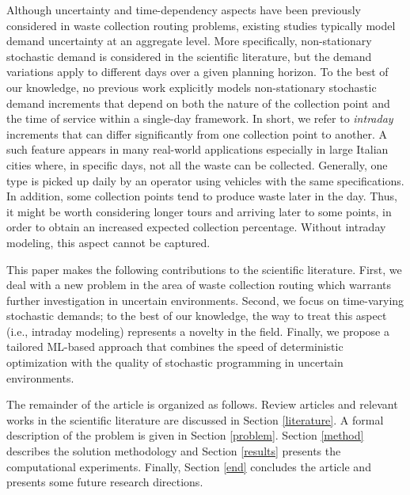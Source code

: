 \documentclass[preprint,11pt,authoryear]{elsarticle}
\begin{document}
Although uncertainty and time-dependency aspects have been previously considered in waste collection routing problems, existing studies typically model demand uncertainty at an aggregate level. More specifically, non-stationary stochastic demand is considered in the scientific literature, but the demand variations apply to different days over a given planning horizon. To the best of our knowledge, no previous work explicitly models non-stationary stochastic demand increments that depend on both the nature of the collection point and the time of service within a single-day framework. In short, we refer to \textit{intraday} increments that can differ significantly from one collection point to another. A such feature appears in many real-world applications especially in large Italian cities where, in specific days, not all the waste can be collected. Generally, one type is picked up daily by an operator using vehicles with the same specifications.
In addition, some collection points tend to produce waste later in the day. Thus, it might be worth considering longer tours and arriving later to some points, in order to obtain an increased expected collection percentage. Without intraday modeling, this aspect cannot be captured.

This paper makes the following contributions to the scientific literature. First, we deal with a new problem in the area of waste collection routing which warrants further investigation in uncertain environments. Second, we focus on  time-varying stochastic demands; to the best of our knowledge, the way to treat this aspect (i.e., intraday modeling) represents a novelty in the field. Finally, we propose a tailored ML-based approach that combines the speed of deterministic optimization with the quality of stochastic programming in uncertain environments.  

The remainder of the article is organized as follows. Review articles and relevant works in the scientific literature are discussed in
Section \ref{literature}. A formal description of the problem is given in Section \ref{problem}. Section \ref{method} describes the solution methodology and Section \ref{results} presents the computational experiments. Finally, Section \ref{end} concludes
the article and presents some future research directions.
\end{document}
